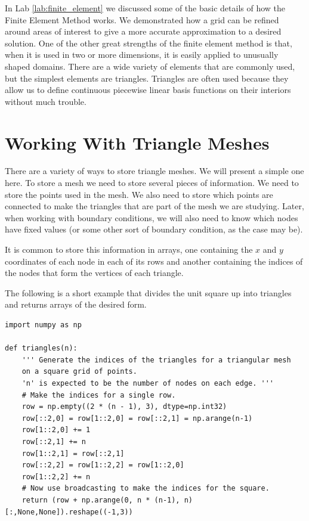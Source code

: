 \label{lab:finite_element_2d}

In Lab \ref{lab:finite_element} we discussed some of the basic details of how the Finite Element Method works.
We demonstrated how a grid can be refined around areas of interest to give a more accurate approximation to a desired solution.
One of the other great strengths of the finite element method is that, when it is used in two or more dimensions, it is easily applied to unusually shaped domains.
There are a wide variety of elements that are commonly used, but the simplest elements are triangles.
Triangles are often used because they allow us to define continuous piecewise linear basis functions on their interiors without much trouble.

\section*{Working With Triangle Meshes}
There are a variety of ways to store triangle meshes.
We will present a simple one here.
To store a mesh we need to store several pieces of information.
We need to store the points used in the mesh.
We also need to store which points are connected to make the triangles that are part of the mesh we are studying.
Later, when working with boundary conditions, we will also need to know which nodes have fixed values (or some other sort of boundary condition, as the case may be).

It is common to store this information in arrays, one containing the $x$ and $y$ coordinates of each node in each of its rows and another containing the indices of the nodes that form the vertices of each triangle.

The following is a short example that divides the unit square up into triangles and returns arrays of the desired form.

\begin{lstlisting}
import numpy as np

def triangles(n):
    ''' Generate the indices of the triangles for a triangular mesh
    on a square grid of points.
    'n' is expected to be the number of nodes on each edge. '''
    # Make the indices for a single row.
    row = np.empty((2 * (n - 1), 3), dtype=np.int32)
    row[::2,0] = row[1::2,0] = row[::2,1] = np.arange(n-1)
    row[1::2,0] += 1
    row[::2,1] += n
    row[1::2,1] = row[::2,1]
    row[::2,2] = row[1::2,2] = row[1::2,0]
    row[1::2,2] += n
    # Now use broadcasting to make the indices for the square.
    return (row + np.arange(0, n * (n-1), n)[:,None,None]).reshape((-1,3))
\end{lstlisting}

